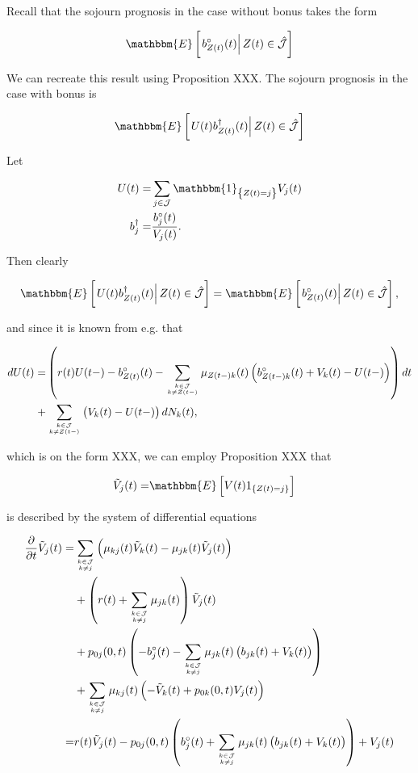 \documentclass{book}
\newcommand{\1}[1]{\mathbbm{1}_{\left\lbrace #1 \right\rbrace}}
\newcommand{\expec}[1][def]{\mathbbm{E} \left[ #1 \right]}
\newcommand{\econd}[2][def]{\mathbbm{E} \left[ \left. #1 \right| #2 \right]}
\theoremstyle{break}
\theoremstyle{remark}
\newenvironment{remark}
  {\pushQED{\qed}\renewcommand{\qedsymbol}{\scalebox{1.4}{$\circ$}}\remarkx}
  {\popQED\endremarkx}
\numberwithin{equation}{section}
\begin{document}
\begin{remark}
	Recall that the sojourn prognosis in the case without bonus takes the form
	
	
	
	\begin{align}
	\econd[ b_{Z(t)}^\circ(t)]{Z(t) \in \hat{\mathcal{J}}}
	\end{align}
	
	We can recreate this result using Proposition XXX. The sojourn prognosis in the case with bonus is
	
	\begin{align}
	\econd[ U(t) b_{Z(t)}^\dagger(t)]{Z(t) \in \hat{\mathcal{J}}}
	\end{align}
	
	Let
	
	\begin{align*}
	U(t) =&  \sum_{j \in \mathcal{J}} \1{Z(t)=j} V_j(t) \\
	b_j^\dagger =& \frac{b_j^\circ(t)}{V_j(t)}.
	\end{align*}
	
	Then clearly
	
	\begin{align}
	\econd[ U(t) b_{Z(t)}^\dagger(t)]{Z(t) \in \hat{\mathcal{J}}} = \econd[ b_{Z(t)}^\circ(t)]{Z(t) \in \hat{\mathcal{J}}},
	\end{align}
	
	and since it is known from e.g. \cite{Liv2} that
	
	\begin{align*}
	dU(t) =& \left( r(t)U(t-) - b_{Z(t)}^\circ(t) - \sum_{k \in \mathcal{J} \atop k \neq Z(t-)} \mu_{Z(t-)k}(t) \left( b_{Z(t-)k}^\circ(t) + V_k(t) - U(t-) \right) \right) dt \\
	+& \sum_{k \in \mathcal{J} \atop k \neq Z(t-)} \left(V_k(t) - U(t-) \right) dN_k(t),
	\end{align*}
	
	which is on the form XXX, we can employ Proposition XXX that
	
	\begin{align*}
	\tilde{V}_j(t) =& \expec[ V(t) 1_{\{Z(t)=j\}} ]
	\end{align*}
	
	is described by the system of differential equations
	
	\begin{align*}
	\frac{\partial}{\partial t} \tilde{V}_j(t) =& \sum_{k \in \mathcal{J} \atop k \neq j} \left( \mu_{kj}(t) \tilde{V}_k(t) - \mu_{jk}(t) \tilde{V}_j(t) \right) \\
	&+ \left( r(t) + \sum_{k \in \mathcal{J} \atop k \neq j} \mu_{jk}(t) \right) \tilde{V}_j(t) \\
	&+ p_{0j}(0,t) \left( - b_j^\circ(t) - \sum_{k \in \mathcal{J} \atop k \neq j} \mu_{jk}(t) \left( b_{jk}(t) + V_k(t) \right) \right) \\
	&+ \sum_{k \in \mathcal{J} \atop k \neq j} \mu_{kj}(t) \left(
	-\tilde{V}_k(t) + p_{0k}(0,t) V_j(t) \right) \\
	=& r(t) \tilde{V}_j(t) - p_{0j}(0,t) \left( b_j^\circ(t) + \sum_{k \in \mathcal{J} \atop k \neq j} \mu_{jk}(t) \left( b_{jk}(t) + V_k(t) \right) \right) + V_j(t)
	\end{align*}
	

\end{remark}
\end{document}
